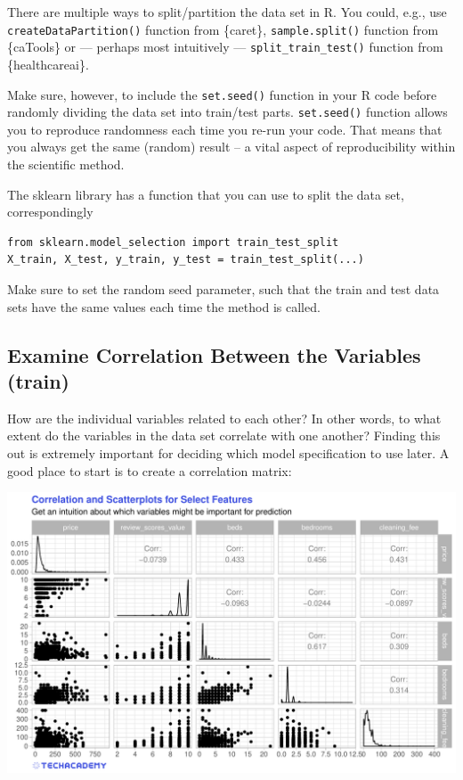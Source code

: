 \documentclass[
  11pt,
]{article}
\newenvironment{tips}[1]
  {
  \begin{itemize}
  \footnotesize
  \renewcommand{\labelitemi}{
    \raisebox{-.7\height}[0pt][0pt]{
      {\setkeys{Gin}{width=3em,keepaspectratio}
        \texttt{[image: images/\#1.png]}}
    }
  }
  \setlength{\fboxsep}{1em}
  \begin{rbox}
  \item
  }
  {
  \end{rbox}
  \end{itemize}
  }
\newenvironment{tipsp}[1]
  {
  \begin{itemize}
  \footnotesize
  \renewcommand{\labelitemi}{
    \raisebox{-.7\height}[0pt][0pt]{
      {\setkeys{Gin}{width=3em,keepaspectratio}
        \texttt{[image: images/\#1.png]}}
    }
  }
  \setlength{\fboxsep}{1em}
  \begin{pbox}
  \item
  }
  {
  \end{pbox}
  \end{itemize}
  }
\begin{document}
\begin{tips}r
There are multiple ways to split/partition the data set in R. You could, e.g., use \texttt{createDataPartition()} function from \{caret\}, \texttt{sample.split()} function from \{caTools\} or --- perhaps most intuitively --- \texttt{split\_train\_test()} function from \{healthcareai\}.

Make sure, however, to include the \texttt{set.seed()} function in your R code before randomly dividing the data set into train/test parts. \texttt{set.seed()} function allows you to reproduce randomness each time you re-run your code. That means that you always get the same (random) result -- a vital aspect of reproducibility within the scientific method.

\end{tips}

\begin{tipsp}p
The sklearn library has a function that you can use to split the data set, correspondingly

\begin{verbatim}
from sklearn.model_selection import train_test_split
X_train, X_test, y_train, y_test = train_test_split(...)
\end{verbatim}

Make sure to set the random seed parameter, such that the train and test data sets have the same values each time the method is called.

\end{tipsp}

\hypertarget{examine-correlation-between-the-variables-train}{%
\subsection{Examine Correlation Between the Variables (train)}\label{examine-correlation-between-the-variables-train}}

How are the individual variables related to each other? In other words, to what extent do the variables in the data set correlate with one another? Finding this out is extremely important for deciding which model specification to use later. A good place to start is to create a correlation matrix:

\begin{center}\includegraphics[width=1\linewidth]{plot/5_1_ggpairs} \end{center}
\end{document}

